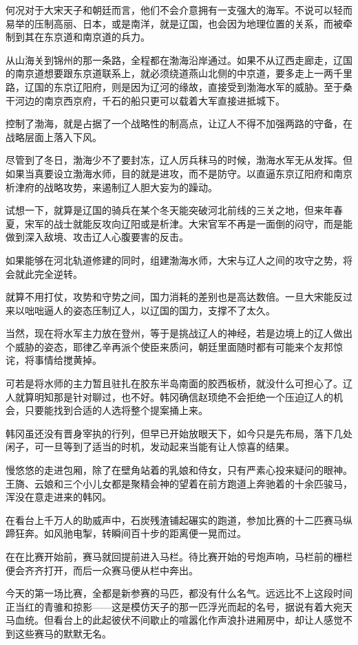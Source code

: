 何况对于大宋天子和朝廷而言，他们不会介意拥有一支强大的海军。不说可以轻而易举的压制高丽、日本，或是南洋，就是辽国，也会因为地理位置的关系，而被牵制到其在东京道和南京道的兵力。

从山海关到锦州的那一条路，全程都在渤海沿岸通过。如果不从辽西走廊走，辽国的南京道想要跟东京道联系上，就必须绕道燕山北侧的中京道，要多走上一两千里路，辽国的东京辽阳府，则是因为辽河的缘故，直接受到渤海水军的威胁。至于桑干河边的南京西京府，千石的船只更可以载着大军直接进抵城下。

控制了渤海，就是占据了一个战略性的制高点，让辽人不得不加强两路的守备，在战略层面上落入下风。

尽管到了冬日，渤海少不了要封冻，辽人厉兵秣马的时候，渤海水军无从发挥。但如果当真要设立渤海水师，目的就是进攻，而不是防守。以直逼东京辽阳府和南京析津府的战略攻势，来遏制辽人胆大妄为的躁动。

试想一下，就算是辽国的骑兵在某个冬天能突破河北前线的三关之地，但来年春夏，宋军的战士就能反攻向辽阳或是析津。大宋官军不再是一面倒的闷守，而是能做到深入敌境、攻击辽人心腹要害的反击。

如果能够在河北轨道修建的同时，组建渤海水师，大宋与辽人之间的攻守之势，将会就此完全逆转。

就算不用打仗，攻势和守势之间，国力消耗的差别也是高达数倍。一旦大宋能反过来以咄咄逼人的姿态压制辽人，以辽国的国力，支撑不了太久。

当然，现在将水军主力放在登州，等于是挑战辽人的神经，若是边境上的辽人做出个威胁的姿态，耶律乙辛再派个使臣来质问，朝廷里面随时都有可能来个友邦惊诧，将事情给搅黄掉。

可若是将水师的主力暂且驻扎在胶东半岛南面的胶西板桥，就没什么可担心了。辽人就算明知那是针对聊过，也不好。韩冈确信赵顼绝不会拒绝一个压迫辽人的机会，只要能找到合适的人选将整个提案捅上来。

韩冈虽还没有晋身宰执的行列，但早已开始放眼天下，如今只是先布局，落下几处闲子，可一旦等到了适当的时机，发动起来当能有让人惊喜的结果。

慢悠悠的走进包厢，除了在壁角站着的乳娘和侍女，只有严素心投来疑问的眼神。王旖、云娘和三个小儿女都是聚精会神的望着在前方跑道上奔驰着的十余匹骏马，浑没在意走进来的韩冈。

在看台上千万人的助威声中，石炭残渣铺起碾实的跑道，参加比赛的十二匹赛马纵蹄狂奔。如风驰电掣，转瞬间百十步的距离便一晃而过。

在在比赛开始前，赛马就回提前进入马栏。待比赛开始的号炮声响，马栏前的栅栏便会齐齐打开，而后一众赛马便从栏中奔出。

今天的第一场比赛，全都是新参赛的马匹，都没有什么名气。远远比不上这段时间正当红的青骓和掠影——这是模仿天子的那一匹浮光而起的名号，据说有着大宛天马血统。但看台上的此起彼伏不间歇止的喧嚣化作声浪扑进厢房中，却让人感觉不到这些赛马的默默无名。

